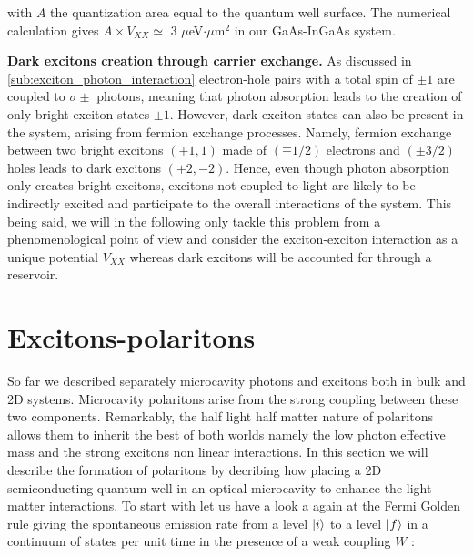 with $A$ the quantization area equal to the  quantum well surface. The numerical calculation gives $A \times V_{XX}\simeq$ 3 $\mu$eV$\cdot \mu$m$^{2}$ in our GaAs-InGaAs system.

\bigskip

\textbf{Dark excitons creation through carrier exchange.} As discussed in \autoref{sub:exciton_photon_interaction} electron-hole pairs with a total spin of $\pm1$ are coupled to $\sigma\pm$ photons, meaning that photon absorption leads to the creation of only bright exciton states $\pm1$. However, dark exciton states can also be present in the system, arising from fermion exchange processes.
Namely, fermion exchange between two bright excitons $(+1,1)$ made of $(\mp1/2)$ electrons and $(\pm3/2)$ holes leads to dark excitons $(+2,-2)$. Hence, even though photon absorption only creates bright excitons, excitons not coupled to light are likely to be indirectly excited and participate to the overall interactions of the system.
This being said, we will in the following only tackle this problem from a phenomenological point of view and consider the exciton-exciton interaction as a unique potential $V_{XX}$ whereas dark excitons will be accounted for through a reservoir.

  
\section{Excitons-polaritons}
So far we described separately microcavity photons and excitons both in bulk and 2D systems. Microcavity polaritons arise from the
strong coupling between these two components. Remarkably, the half light half matter nature of polaritons allows them to inherit the best of both worlds namely 
the low photon effective mass and the strong excitons non linear interactions. In this section we will describe the formation of polaritons 
by decribing how placing a 2D semiconducting quantum well in an optical microcavity to enhance the light-matter interactions. To start with let us 
have a look a again at the Fermi Golden rule giving the spontaneous emission rate from a level $\ket{i}$ to a level $\ket{f}$ in a continuum of states per unit time in the presence of a weak coupling $W$ :


